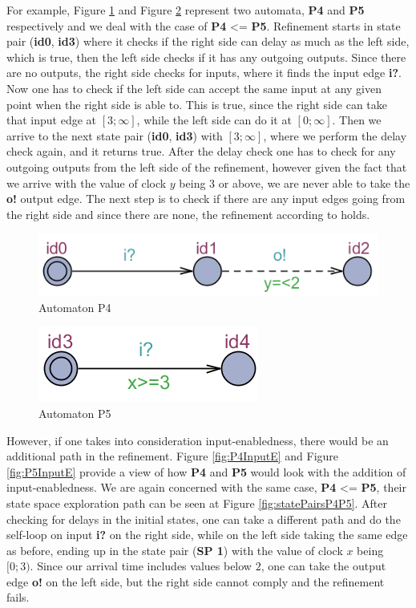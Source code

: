 For example, Figure \ref{fig:P4} and Figure \ref{fig:P5} represent two automata, \textbf{P4} and \textbf{P5} respectively and we deal with the case of \textbf{P4} <= \textbf{P5}. Refinement starts in state pair (\textbf{id0}, \textbf{id3}) where it checks if the right side can delay as much as the left side, which is true, then the left side checks if it has any outgoing outputs. Since there are no outputs, the right side checks for inputs, where it finds the input edge \textbf{i?}. Now one has to check if the left side can accept the same input at any given point when the right side is able to. This is true, since the right side can take that input edge at $[3;\infty]$, while the left side can do it at $[0;\infty]$. Then we arrive to the next state pair (\textbf{id0}, \textbf{id3}) with $[3;\infty]$, where we perform the delay check again, and it returns true. After the delay check one has to check for any outgoing outputs from the left side of the refinement, however given the fact that we arrive with the value of clock $y$ being $3$ or above, we are never able to take the \textbf{o!} output edge. The next step is to check if there are any input edges going from the right side and since there are none, the refinement according to \ecdar holds.
\begin{figure}
    \centering
    \includegraphics[scale = 0.7]{figures/P4.png}
    \caption{Automaton P4}
    \label{fig:P4}
\end{figure}
\begin{figure}
    \centering
    \includegraphics[scale = 0.7]{figures/P5.png}
    \caption{Automaton P5}
    \label{fig:P5}
\end{figure}

However, if one takes into consideration input-enabledness, there would be an additional path in the refinement. Figure \ref{fig:P4InputE} and Figure \ref{fig:P5InputE} provide a view of how \textbf{P4} and \textbf{P5} would look with the addition of input-enabledness. We are again concerned with the same case, \textbf{P4} <= \textbf{P5}, their state space exploration path can be seen at Figure \ref{fig:statePairsP4P5}. After checking for delays in the initial states, one can take a different path and do the self-loop on input \textbf{i?} on the right side, while on the left side taking the same edge as before, ending up in the state pair (\textbf{SP 1}) with the value of clock $x$ being $[0;3)$. Since our arrival time includes values below $2$, one can take the output edge \textbf{o!} on the left side, but the right side cannot comply and the refinement fails.

